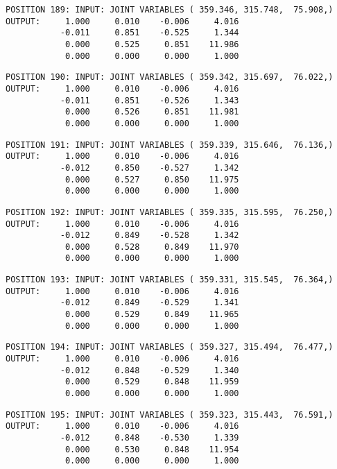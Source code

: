 \begin{verbatim}
POSITION 189: INPUT: JOINT VARIABLES ( 359.346, 315.748,  75.908,)
OUTPUT:     1.000     0.010    -0.006     4.016
           -0.011     0.851    -0.525     1.344
            0.000     0.525     0.851    11.986
            0.000     0.000     0.000     1.000
\end{verbatim} \pagebreak[1]\begin{verbatim}
POSITION 190: INPUT: JOINT VARIABLES ( 359.342, 315.697,  76.022,)
OUTPUT:     1.000     0.010    -0.006     4.016
           -0.011     0.851    -0.526     1.343
            0.000     0.526     0.851    11.981
            0.000     0.000     0.000     1.000
\end{verbatim} \pagebreak[1]\begin{verbatim}
POSITION 191: INPUT: JOINT VARIABLES ( 359.339, 315.646,  76.136,)
OUTPUT:     1.000     0.010    -0.006     4.016
           -0.012     0.850    -0.527     1.342
            0.000     0.527     0.850    11.975
            0.000     0.000     0.000     1.000
\end{verbatim} \pagebreak[1]\begin{verbatim}
POSITION 192: INPUT: JOINT VARIABLES ( 359.335, 315.595,  76.250,)
OUTPUT:     1.000     0.010    -0.006     4.016
           -0.012     0.849    -0.528     1.342
            0.000     0.528     0.849    11.970
            0.000     0.000     0.000     1.000
\end{verbatim} \pagebreak[1]\begin{verbatim}
POSITION 193: INPUT: JOINT VARIABLES ( 359.331, 315.545,  76.364,)
OUTPUT:     1.000     0.010    -0.006     4.016
           -0.012     0.849    -0.529     1.341
            0.000     0.529     0.849    11.965
            0.000     0.000     0.000     1.000
\end{verbatim} \pagebreak[1]\begin{verbatim}
POSITION 194: INPUT: JOINT VARIABLES ( 359.327, 315.494,  76.477,)
OUTPUT:     1.000     0.010    -0.006     4.016
           -0.012     0.848    -0.529     1.340
            0.000     0.529     0.848    11.959
            0.000     0.000     0.000     1.000
\end{verbatim} \pagebreak[1]\begin{verbatim}
POSITION 195: INPUT: JOINT VARIABLES ( 359.323, 315.443,  76.591,)
OUTPUT:     1.000     0.010    -0.006     4.016
           -0.012     0.848    -0.530     1.339
            0.000     0.530     0.848    11.954
            0.000     0.000     0.000     1.000
\end{verbatim} \pagebreak[1]\begin{verbatim}

\end{verbatim}
